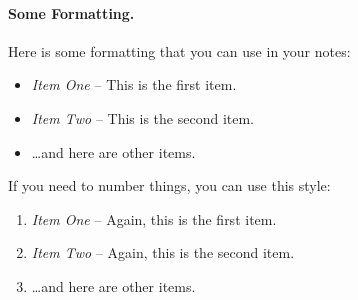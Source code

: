 \documentclass[11pt]{article}
\begin{document}
\paragraph{Some Formatting.}
Here is some formatting that you can use in your notes:
\begin{itemize}
\item {\em Item One} -- This is the first item.
\item {\em Item Two} -- This is the second item.
\item \dots and here are other items.
\end{itemize}

If you need to number things, you can use this style:
\begin{enumerate}
\item {\em Item One} -- Again, this is the first item.
\item {\em Item Two} -- Again, this is the second item.
\item \dots and here are other items.
\end{enumerate}

%

\end{document}
